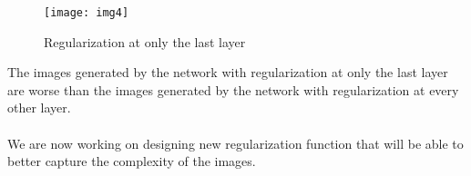 \documentclass[12pt]{article}
\begin{document}
\begin{figure}[H]
	\centering
	\texttt{[image: img4]}
	\caption{Regularization at only the last layer}
\end{figure}

The images generated by the network with regularization at only the last layer are worse than the images generated by the network with regularization at every other layer.
\\
\\
We are now working on designing new regularization function that will be able to better capture the complexity of the images.
\end{document}
